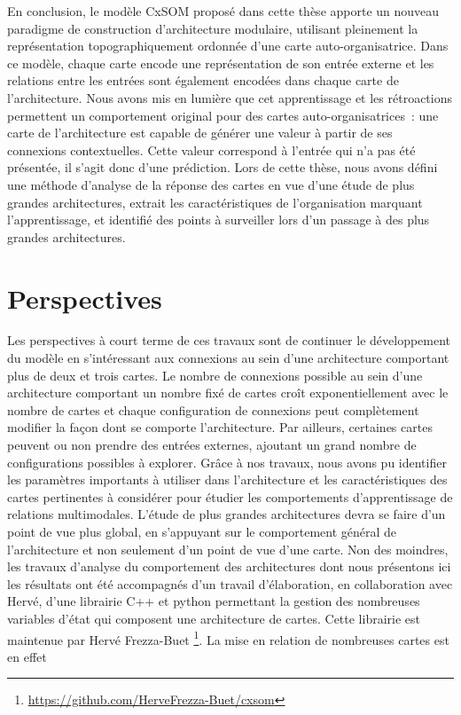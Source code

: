 En conclusion, le modèle CxSOM proposé dans cette thèse apporte un nouveau paradigme de construction d'architecture modulaire, utilisant pleinement la représentation topographiquement ordonnée d'une carte auto-organisatrice.
Dans ce modèle, chaque carte encode une représentation de son entrée externe et les relations entre les entrées sont également encodées dans chaque carte de l'architecture. 
Nous avons mis en lumière que cet apprentissage et les rétroactions permettent un comportement original pour des cartes auto-organisatrices~: une carte de l'architecture est capable de générer une valeur à partir de ses connexions contextuelles. Cette valeur correspond à l'entrée qui n'a pas été présentée, il s'agit donc d'une prédiction.
Lors de cette thèse, nous avons défini une méthode d'analyse de la réponse des cartes en vue d'une étude de plus grandes architectures, extrait les caractéristiques de l'organisation marquant l'apprentissage, et identifié des points à surveiller lors d'un passage à des plus grandes architectures.

\section*{Perspectives}

Les perspectives à court terme de ces travaux sont de continuer le développement du modèle en s'intéressant aux connexions au sein d'une architecture comportant plus de deux et trois cartes.
Le nombre de connexions possible au sein d'une architecture comportant un nombre fixé de cartes croît exponentiellement avec le nombre de cartes et chaque configuration de connexions peut complètement modifier la façon dont se comporte l'architecture. Par ailleurs, certaines cartes peuvent ou non prendre des entrées externes, ajoutant un grand nombre de configurations possibles à explorer.
Grâce à nos travaux, nous avons pu identifier les paramètres importants à utiliser dans l'architecture et les caractéristiques des cartes pertinentes à considérer pour étudier les comportements d'apprentissage de relations multimodales. L'étude de plus grandes architectures devra se faire d'un point de vue plus global, en s'appuyant sur le comportement général de l'architecture et non seulement d'un point de vue d'une carte. 
Non des moindres, les travaux d'analyse du comportement des architectures dont nous présentons ici les résultats ont été accompagnés d'un travail d'élaboration, en collaboration avec Hervé, d'une librairie C++ et python permettant la gestion des nombreuses variables d'état qui composent une architecture de cartes. Cette librairie est maintenue par Hervé Frezza-Buet \footnote{\url{https://github.com/HerveFrezza-Buet/cxsom}}. La mise en relation de nombreuses cartes est en effet 


